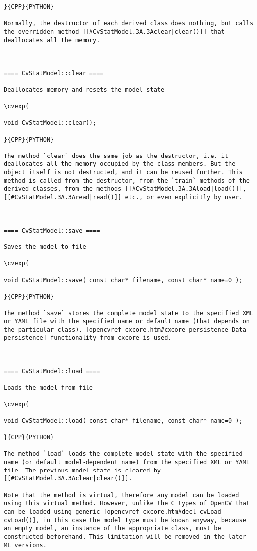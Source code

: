 \begin{verbatim}
}{CPP}{PYTHON}

Normally, the destructor of each derived class does nothing, but calls the overridden method [[#CvStatModel.3A.3Aclear|clear()]] that deallocates all the memory.

----

==== CvStatModel::clear ====

Deallocates memory and resets the model state

\cvexp{

void CvStatModel::clear();

}{CPP}{PYTHON}

The method `clear` does the same job as the destructor, i.e. it deallocates all the memory occupied by the class members. But the object itself is not destructed, and it can be reused further. This method is called from the destructor, from the `train` methods of the derived classes, from the methods [[#CvStatModel.3A.3Aload|load()]], [[#CvStatModel.3A.3Aread|read()]] etc., or even explicitly by user.

----

==== CvStatModel::save ====

Saves the model to file

\cvexp{

void CvStatModel::save( const char* filename, const char* name=0 );

}{CPP}{PYTHON}

The method `save` stores the complete model state to the specified XML or YAML file with the specified name or default name (that depends on the particular class). [opencvref_cxcore.htm#cxcore_persistence Data persistence] functionality from cxcore is used.

----

==== CvStatModel::load ====

Loads the model from file

\cvexp{

void CvStatModel::load( const char* filename, const char* name=0 );

}{CPP}{PYTHON}

The method `load` loads the complete model state with the specified name (or default model-dependent name) from the specified XML or YAML file. The previous model state is cleared by [[#CvStatModel.3A.3Aclear|clear()]].

Note that the method is virtual, therefore any model can be loaded using this virtual method. However, unlike the C types of OpenCV that can be loaded using generic [opencvref_cxcore.htm#decl_cvLoad cvLoad()], in this case the model type must be known anyway, because an empty model, an instance of the appropriate class, must be constructed beforehand. This limitation will be removed in the later ML versions.


\end{verbatim}
